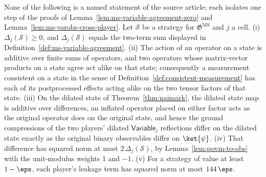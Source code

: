 \begin{lemma}\label{lem:ms-variable-agreement-support}
	\leanok
	None of the following is a named statement of the source article; each isolates one step of the proofs of Lemma~\ref{lem:ms-variable-agreement-zero} and Lemma~\ref{lem:ms-varobs-cross-player}. Let $\mathcal S$ be a strategy for $\mathfrak{G}^{\mathrm{MS}}$ and $j$ a cell. (i) $\Delta_j(\mathcal S) \ge 0$, and $\Delta_j(\mathcal S)$ equals the two-term sum displayed in Definition~\ref{def:ms-variable-agreement}. (ii) The action of an operator on a state is additive over finite sums of operators, and two operators whose matrix-vector products on a state agree act alike on that state; consequently a measurement consistent on a state in the sense of Definition~\ref{def:consistent-measurement} has each of its postprocessed effects acting alike on the two tensor factors of that state. (iii) On the dilated state of Theorem~\ref{thm:naimark}, the dilated state map is additive over differences, an inflated operator placed on either factor acts as the original operator does on the original state, and hence the ground compressions of the two players' dilated $\mathsf{Variable}_j$ reflections differ on the dilated state exactly as the original binary observables differ on $\ket{\psi}$. (iv) That difference has squared norm at most $2\,\Delta_j(\mathcal S)$, by Lemma~\ref{lem:povm-to-obs} with the unit-modulus weights $1$ and $-1$. (v) For a strategy of value at least $1-\eps$, each player's leakage term has squared norm at most $144\,\eps$.
\end{lemma}
